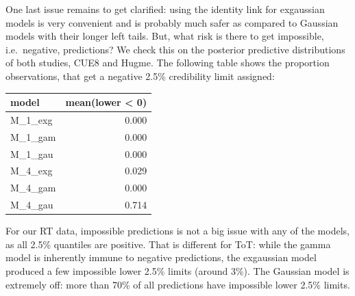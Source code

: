 \documentclass[]{svmono}
\newenvironment{Shaded}{\begin{snugshade}}{\end{snugshade}}
\newcommand{\KeywordTok}[1]{\textcolor[rgb]{0.13,0.29,0.53}{\textbf{#1}}}
\newcommand{\DecValTok}[1]{\textcolor[rgb]{0.00,0.00,0.81}{#1}}
\newcommand{\StringTok}[1]{\textcolor[rgb]{0.31,0.60,0.02}{#1}}
\newcommand{\OperatorTok}[1]{\textcolor[rgb]{0.81,0.36,0.00}{\textbf{#1}}}
\newcommand{\NormalTok}[1]{#1}
\theoremstyle{definition}
\theoremstyle{definition}
\theoremstyle{definition}
\theoremstyle{remark}
\begin{document}
One last issue remains to get clarified: using the identity link for
exgaussian models is very convenient and is probably much safer as
compared to Gaussian models with their longer left tails. But, what risk
is there to get impossible, i.e.~negative, predictions? We check this on
the posterior predictive distributions of both studies, CUE8 and Hugme.
The following table shows the proportion observations, that get a
negative 2.5\% credibility limit assigned:

\begin{Shaded}
\end{Shaded}

\begin{tabular}{l|r}
\hline
model & mean(lower < 0)\\
\hline
M\_1\_exg & 0.000\\
\hline
M\_1\_gam & 0.000\\
\hline
M\_1\_gau & 0.000\\
\hline
M\_4\_exg & 0.029\\
\hline
M\_4\_gam & 0.000\\
\hline
M\_4\_gau & 0.714\\
\hline
\end{tabular}

For our RT data, impossible predictions is not a big issue with any of
the models, as all 2.5\% quantiles are positive. That is different for
ToT: while the gamma model is inherently immune to negative predictions,
the exgaussian model produced a few impossible lower 2.5\% limits
(around 3\%). The Gaussian model is extremely off: more than 70\% of all
predictions have impossible lower 2.5\% limits.
\end{document}

